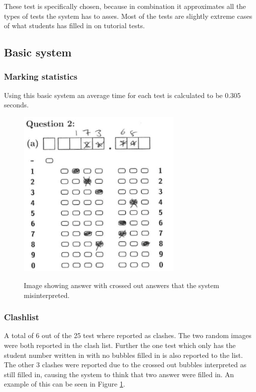 These test is specifically chosen, because in combination it approximates all the types of tests the system has to asses. Most of the tests are slightly extreme cases of what students has filled in on tutorial tests. 

\subsection{Basic system}


\subsubsection{Marking statistics}

Using this basic system an average time for each test is calculated to be 0.305 seconds. 

\begin{figure}
  \centering
  \includegraphics[width=8cm]{crossClash}\\
  \caption{Image showing answer with crossed out answers that the system misinterpreted.}
  \label{fig:crossClash}
\end{figure}

\subsubsection{Clashlist}

A total of 6 out of the 25 test where reported as clashes. The two random images were both reported in the clash list. Further the one test which only has the student number written in with no bubbles filled in is also reported to the list. The other 3 clashes were reported due to the crossed out bubbles interpreted as still filled in, causing the system to think that two answer were filled in. An example of this can be seen in Figure \ref{fig:crossClash}.



